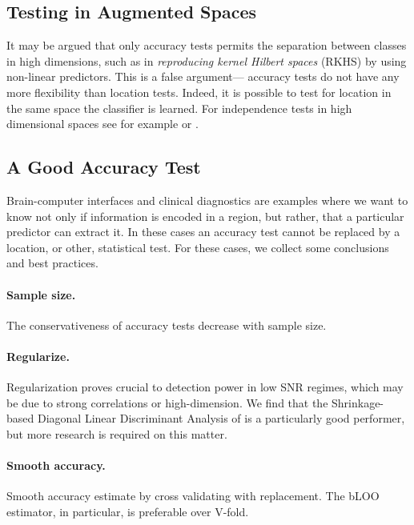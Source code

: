 \documentclass[12pt,a4paper]{article}
\begin{document}
\subsection{Testing in Augmented Spaces}
It may be argued that only accuracy tests permits the separation between classes in high dimensions, such as in \emph{reproducing kernel Hilbert spaces} (RKHS) by using non-linear predictors. 
This is a false argument--- accuracy tests do not have any more flexibility than location tests. 
Indeed, it is possible to test for location in the same space the classifier is learned. 
For independence tests in high dimensional spaces see for example \cite{szekely_brownian_2009} or \citet{gretton_kernel_2012-1}.



\subsection{A Good Accuracy Test}
Brain-computer interfaces and clinical diagnostics \citep[e.g.][]{olivetti_induction_2012,wager_fmri-based_2013} are examples where we want to know not only if information is encoded in a region, but rather, that a particular predictor can extract it. 
In these cases an accuracy test cannot be replaced by a location, or other, statistical test. 
For these cases, we collect some conclusions and best practices. 

\paragraph{Sample size.} The conservativeness of accuracy tests decrease with sample size. 

\paragraph{Regularize.}
Regularization proves crucial to detection power in low SNR regimes, which may be due to strong correlations or high-dimension.
We find that the Shrinkage-based Diagonal Linear Discriminant Analysis of \cite{pang_shrinkage-based_2009} is a particularly good performer, but more research is required on this matter. 


\paragraph{Smooth accuracy.}
Smooth accuracy estimate by cross validating with replacement. 
The bLOO estimator, in particular, is preferable over V-fold.
\end{document}
